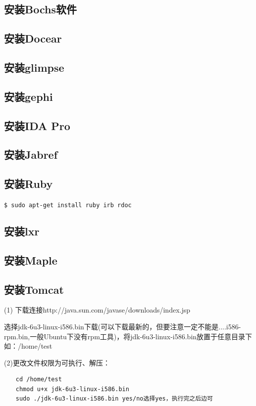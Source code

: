 \subsection{安装Bochs软件}

\subsection{安装Docear}

\subsection{安装glimpse}

\subsection{安装gephi}

\subsection{安装IDA Pro}

\subsection{安装Jabref}

\subsection{安装Ruby}
\verb"$ sudo apt-get install ruby irb rdoc"

\subsection{安装lxr}

\subsection{安装Maple}

\subsection{安装Tomcat}
(1)	下载连接http://java.sun.com/javase/downloads/index.jsp

选择jdk-6u3-linux-i586.bin下载(可以下载最新的，但要注意一定不能是....i586-rpm.bin,一般Ubuntu下没有rpm工具)，将jdk-6u3-linux-i586.bin放置于任意目录下如：/home/test

(2)更改文件权限为可执行、解压：
\begin{verbatim}
　　cd /home/test
　　chmod u+x jdk-6u3-linux-i586.bin
　　sudo ./jdk-6u3-linux-i586.bin yes/no选择yes，执行完之后边可
\end{verbatim}

